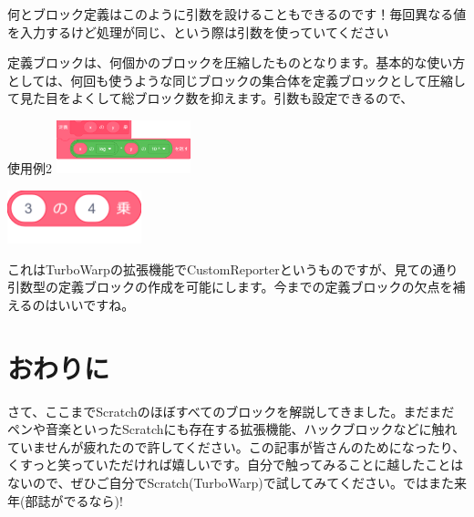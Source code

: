 \documentclass[b5paper,10pt]{jsarticle}
\begin{document}
\begin{multicols*}{3}
何とブロック定義はこのように引数を設けることもできるのです！毎回異なる値を入力するけど処理が同じ、という際は引数を使っていてください

定義ブロックは、何個かのブロックを圧縮したものとなります。基本的な使い方としては、何回も使うような同じブロックの集合体を定義ブロックとして圧縮して見た目をよくして総ブロック数を抑えます。引数も設定できるので、
\begin{itembox}{使用例2}
\includegraphics[width=39mm]{images/teigi_5.png}

\includegraphics[width=39mm]{images/teigi_6.png}
\end{itembox}
これはTurboWarpの拡張機能でCustomReporterというものですが、見ての通り引数型の定義ブロックの作成を可能にします。今までの定義ブロックの欠点を補えるのはいいですね。

\section{おわりに}

さて、ここまでScratchのほぼすべてのブロックを解説してきました。まだまだペンや音楽といったScratchにも存在する拡張機能、ハックブロックなどに触れていませんが疲れたので許してください。この記事が皆さんのためになったり、くすっと笑っていただければ嬉しいです。自分で触ってみることに越したことはないので、ぜひご自分でScratch(TurboWarp)で試してみてください。ではまた来年(部誌がでるなら)!

\end{multicols*}
\end{document}
